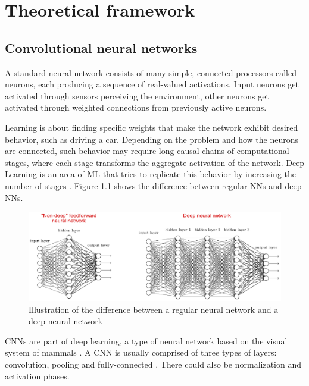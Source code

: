 \chapter{Theoretical framework}
\label{ch:marco}

\section{Convolutional neural networks}

A standard neural network consists of many simple, connected processors called neurons,
each producing a sequence of real-valued activations. Input neurons get activated through 
sensors perceiving the environment, other neurons get activated through weighted connections from previously
active neurons.

Learning is about finding specific weights that make the network exhibit desired behavior,
such as driving a car. Depending on the problem and how the neurons are connected, such behavior
may require long causal chains of computational stages, where each stage transforms 
the aggregate activation of the network. Deep Learning is an area of ML that tries to
replicate this behavior by increasing the number of stages \cite{schmidhuber2015deep}.
Figure \ref{fig:nnvscnn} shows the difference between regular NNs and deep NNs.

\begin{figure}
  \includegraphics[width=\linewidth]{fig/nnvscnn.eps}
  \caption{Illustration of the difference between a regular neural network and a deep neural network \cite{nielsen2015neural}}
  \label{fig:nnvscnn}
\end{figure}

CNNs are part of deep learning, a type of neural network based on the 
visual system of mammals \cite{fukushima1980neocognitron}\cite{hubel1968receptive}.
A CNN is usually comprised of three types of layers: convolution, pooling and 
fully-connected \cite{karpathy2016cs231n}. There could also be normalization and activation phases.

